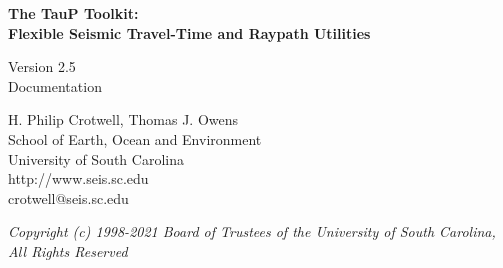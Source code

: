 
\begin{titlepage}
\begin{center}

\vspace{2in}

\LARGE
\textbf{
The TauP Toolkit: \\
Flexible Seismic Travel-Time and Raypath Utilities \\
}

\large
Version 2.5 \\
Documentation

\vspace{3in}

H. Philip Crotwell, Thomas J. Owens \\
School of Earth, Ocean and Environment \\
University of South Carolina \\
http://www.seis.sc.edu \\
crotwell@seis.sc.edu

\vspace{3in}

\textit{
\normalsize
Copyright (c) 1998-2021 Board of Trustees of the University of South Carolina, \\
All Rights Reserved
\normalsize}

\end{center}
\end{titlepage}
